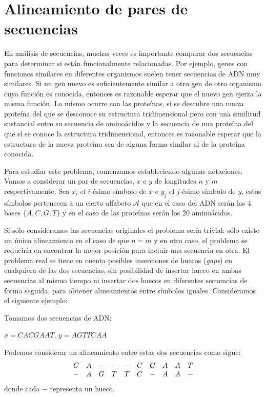 \section{Alineamiento de pares de secuencias}
En análisis de secuencias, muchas veces es importante comparar dos secuencias para determinar si están funcionalmente relacionadas. Por ejemplo, genes con funciones similares en diferentes organismos suelen tener secuencias de ADN muy similares. Si un gen nuevo es suficientemente similar a otro gen de otro organismo cuya función es conocida, entonces es razonable esperar que el nuevo gen ejerza la misma función. Lo mismo ocurre con las proteínas, si se descubre una nueva proteína del que se desconoce su estructura tridimensional pero con una similitud sustancial entre su secuencia de aminoácidos y la secuencia de una proteína del que sí se conoce la estructura tridimensional, entonces es razonable esperar que la estructura de la nueva proteína sea de alguna forma similar al de la proteína conocida.

Para estudiar este problema, comenzamos estableciendo algunas notaciones. Vamos a considerar un par de secuencias, $x$ e $y$ de longitudes $n$ y $m$ respectivamente. Sea $x_i$ el $i$-ésimo símbolo de $x$ e $y_j$ el $j$-ésimo símbolo de $y$, estos símbolos pertenecen a un cierto alfabeto $\mathcal{A}$ que en el caso del ADN serán las $4$ bases $\{A,C,G,T\}$ y en el caso de las proteínas serán los $20$ aminoácidos.

Si sólo consideramos las secuencias originales el problema sería trivial: sólo existe un único alineamiento en el caso de que $n=m$ y en otro caso, el problema se reduciría en encontrar la mejor posición para incluir una secuencia en otra. El problema real se tiene en cuenta posibles inserciones de huecos (\textit{gaps}) en cualquiera de las dos secuencias, sin posibilidad de insertar hueco en ambas secuencias al mismo tiempo ni insertar dos huecos en diferentes secuencias de forma seguida, para obtener alineamientos entre símbolos iguales. Consideramos el siguiente ejemplo:

\begin{exampleth}
    Tomamos dos secuencias de ADN:
    \begin{center}
        $x=CACGAAT$, $y=AGTTCAA$
    \end{center}
    Podemos considerar un alineamiento entre estas dos secuencias como sigue:
    \[\begin{array}{c c c c c c c c c c}
        C & A & - & - & - & C & G & A & A & T \\
        - & A & G & T & T & C & - & A & A & -
    \end{array}\]
    donde cada $-$ representa un hueco.
\end{exampleth}

